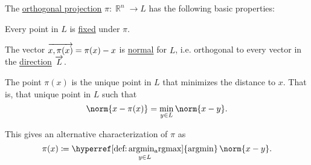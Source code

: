 \begin{proposition}\label{thm:def:orthogonal_projection}
  The \hyperref[def:orthogonal_projection]{orthogonal projection} \( \pi: \BbbR^n \to L \) has the following basic properties:

  \begin{thmenum}
     Every point in \( L \) is \hyperref[def:function_fixed_point]{fixed} under \( \pi \).

     The vector \( \overrightarrow{x,\pi(x)} = \pi(x) - x \) is \hyperref[def:normal_vector]{normal} for \( L \), i.e. orthogonal to every vector in the \hyperref[def:affine_subspace]{direction} \( \overrightarrow{L} \).

     The point \( \pi(x) \) is the unique point in \( L \) that minimizes the distance to \( x \). That is, that unique point in \( L \) such that
    \begin{equation*}
      \norm{ x - \pi(x) } = \min_{y \in L} \norm{ x - y }.
    \end{equation*}

    This gives an alternative characterization of \( \pi \) as
    \begin{equation}\label{eq:thm:def:orthogonal_projection/distance/argmin}
      \pi(x) \coloneqq \operatorname*{\hyperref[def:argmin_argmax]{argmin}}_{y \in L} \norm{ x - y }.
    \end{equation}
  \end{thmenum}
\end{proposition}
